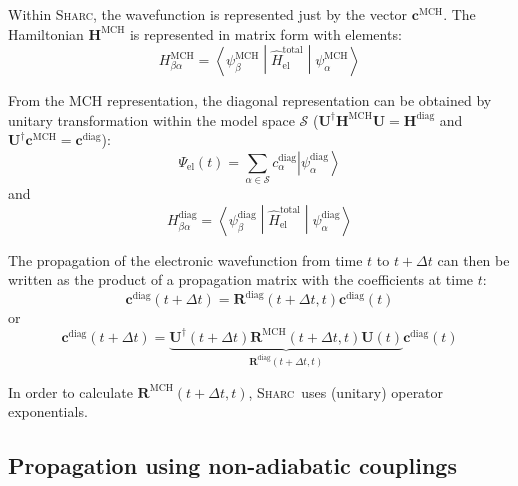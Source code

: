 \documentclass[a4paper,11pt,DIV=15,openany,twoside=false]{scrbook}
\newcommand{\sharc}{\textsc{Sharc}}
\renewcommand{\vec}[1]{\ensuremath{\mathbf{#1}}}
\begin{document}
Within \sharc, the wavefunction is represented just by the vector $\vec{c}^{\text{MCH}}$. The Hamiltonian $\vec{H}^{\text{MCH}}$ is represented in matrix form with elements:
\begin{equation}
  H^{\text{MCH}}_{\beta\alpha}=\left\langle\psi^{\text{MCH}}_\beta\middle|\hat{H}_{\text{el}}^{\text{total}}\middle|\psi^{\text{MCH}}_\alpha\right\rangle
\end{equation}

From the MCH representation, the diagonal representation can be obtained by unitary transformation within the model space $\mathcal{S}$ ($\vec{U}^\dagger\vec{H}^{\text{MCH}}\vec{U}=\vec{H}^{\text{diag}}$ and $\vec{U}^\dagger\vec{c}^{\text{MCH}}=\vec{c}^{\text{diag}}$):
\begin{equation}
  \Psi_{\text{el}}(t)=\sum\limits_{\alpha\in\mathcal{S}} c^{\text{diag}}_\alpha \left|\psi^{\text{diag}}_\alpha\right\rangle
\end{equation}
and
\begin{equation}
  H^{\text{diag}}_{\beta\alpha}=\left\langle\psi^{\text{diag}}_\beta\middle|\hat{H}_{\text{el}}^{\text{total}}\middle|\psi^{\text{diag}}_\alpha\right\rangle
\end{equation}

The propagation of the electronic wavefunction from time $t$ to $t+\Delta t$ can then be written as the product of a propagation matrix with the coefficients at time $t$:
\begin{equation}
  \vec{c}^{\text{diag}}(t+\Delta t)=\vec{R}^{\text{diag}}(t+\Delta t,t)\vec{c}^{\text{diag}}(t)
\end{equation}
or
\begin{equation}
  \vec{c}^{\text{diag}}(t+\Delta t)=\underbrace{\vec{U}^\dagger(t+\Delta t)\vec{R}^{\text{MCH}}(t+\Delta t,t)\vec{U}(t)}_{\vec{R}^{\text{diag}}(t+\Delta t,t)}\vec{c}^{\text{diag}}(t)
\end{equation}

In order to calculate $\vec{R}^{\text{MCH}}(t+\Delta t,t)$, \sharc\ uses (unitary) operator exponentials. 

\subsection{Propagation using non-adiabatic couplings}
\end{document}
